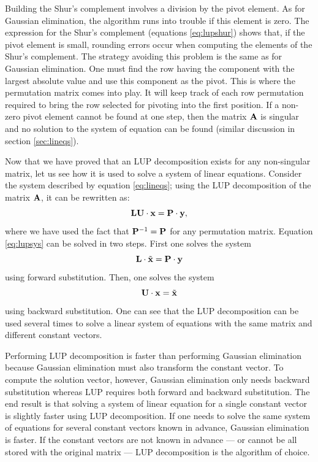 \documentclass[twoside]{book}
\begin{document}
Building the Shur's complement involves a division by the pivot
element. As for Gaussian elimination, the algorithm runs into
trouble if this element is zero. The expression for the Shur's
complement (equations \ref{eq:lupshur}) shows that, if the pivot
element is small, rounding errors occur when computing the
elements of the Shur's complement. The strategy avoiding this
problem is the same as for Gaussian elimination. One must find the
row having the component with the largest absolute value and use
this component as the pivot. This is where the permutation matrix
comes into play. It will keep track of each row permutation
required to bring the row selected for pivoting into the first
position. If a non-zero pivot element cannot be found at one step,
then the matrix ${\bf A}$ is singular and no solution to the
system of equation can be found (\cf similar discussion in section
\ref{sec:lineqs}).

Now that we have proved that an LUP decomposition exists for any
non-singular matrix, let us see how it is used to solve a system
of linear equations. Consider the system described by equation
\ref{eq:lineqs}; using the LUP decomposition of the matrix ${\bf
A}$, it can be rewritten as:
\begin{equation}
\label{eq:lupsys}
  {\bf L}{\bf U}\cdot{\bf x}={\bf P}\cdot{\bf y},
\end{equation}
where we have used the fact that ${\bf P}^{-1}={\bf P}$ for any
permutation matrix. Equation \ref{eq:lupsys} can be solved in two
steps. First one solves the system
\begin{equation}
\label{eq:lupforward}
  {\bf L}\cdot\tilde{{\bf x}}={\bf P}\cdot{\bf y}
\end{equation}
using forward substitution. Then, one solves the system
\begin{equation}
\label{eq:lupbackward}
  {\bf U}\cdot{\bf x}=\tilde{{\bf x}}
\end{equation}
using backward substitution. One can see that the LUP
decomposition can be used several times to solve a linear system
of equations with the same matrix and different constant vectors.

Performing LUP decomposition is faster than performing Gaussian
elimination because Gaussian elimination must also transform the
constant vector. To compute the solution vector, however, Gaussian
elimination only needs backward substitution whereas LUP requires
both forward and backward substitution. The end result is that
solving a system of linear equation for a single constant vector
is slightly faster using LUP decomposition. If one needs to solve
the same system of equations for several constant vectors known in
advance, Gaussian elimination is faster. If the constant vectors
are not known in advance --- or cannot be all stored with the
original matrix --- LUP decomposition is the algorithm of choice.
\end{document}
